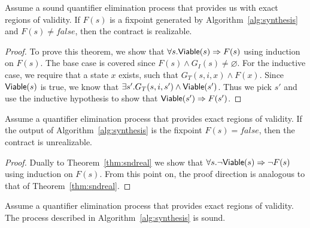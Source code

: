 \begin{theorem}
\label{thm:sndreal}

Assume a sound quantifier elimination process that provides us with exact regions of validity. If $F(s)$ is a fixpoint generated by Algorithm~\ref{alg:synthesis} and $F(s) \neq false$, then the contract is realizable.
\end{theorem}
\begin{proof} To prove this theorem, we show that $\forall s. {\mathsf {Viable}}(s) \Rightarrow F(s)$ using induction on $F(s)$. The base case is covered since $F(s) \land G_I(s) \neq \varnothing$. For the inductive case, we require that a state $x$ exists, such that $G_T(s,i,x) \land F(x)$. Since ${\mathsf {Viable}}(s)$ is true, we know that $\exists s'. G_T(s,i,s') \land {\mathsf {Viable}}(s')$. Thus we pick $s'$ and use the inductive hypothesis to show that ${\mathsf {Viable}}(s') \Rightarrow F(s')$.
\end{proof}

\begin{theorem}
\label{thm:sndunreal}

Assume a quantifier elimination process that provides exact regions of validity. If the output of Algorithm~\ref{alg:synthesis} is the fixpoint $F(s) = false$, then the contract is unrealizable.
\end{theorem}
\begin{proof}
Dually to Theorem~\ref{thm:sndreal} we show that $\forall s. \lnot {\mathsf {Viable}}(s) \Rightarrow \lnot F(s)$ using induction on $F(s)$. From this point on, the proof direction is analogous to that of Theorem~\ref{thm:sndreal}.
\end{proof}


\begin{corollary}
Assume a quantifier elimination process that provides exact regions of validity. The process described in Algorithm~\ref{alg:synthesis} is sound.
\end{corollary}

